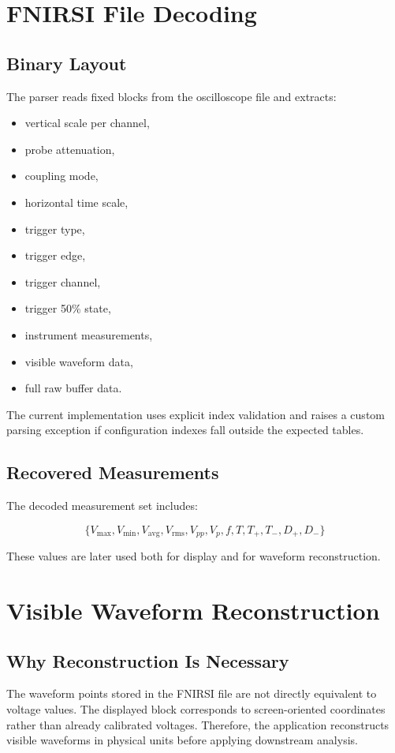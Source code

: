 \documentclass[conference]{IEEEtran}
\begin{document}
\section{FNIRSI File Decoding}
\subsection{Binary Layout}
The parser reads fixed blocks from the oscilloscope file and extracts:

\begin{itemize}
    \item vertical scale per channel,
    \item probe attenuation,
    \item coupling mode,
    \item horizontal time scale,
    \item trigger type,
    \item trigger edge,
    \item trigger channel,
    \item trigger 50\% state,
    \item instrument measurements,
    \item visible waveform data,
    \item full raw buffer data.
\end{itemize}

The current implementation uses explicit index validation and raises a custom parsing exception if configuration indexes fall outside the expected tables.

\subsection{Recovered Measurements}
The decoded measurement set includes:

\begin{equation}
\{V_{\max}, V_{\min}, V_{\mathrm{avg}}, V_{\mathrm{rms}}, V_{pp}, V_p, f, T, T_+, T_-, D_+, D_-\}
\end{equation}

These values are later used both for display and for waveform reconstruction.

\section{Visible Waveform Reconstruction}
\subsection{Why Reconstruction Is Necessary}
The waveform points stored in the FNIRSI file are not directly equivalent to voltage values. The displayed block corresponds to screen-oriented coordinates rather than already calibrated voltages. Therefore, the application reconstructs visible waveforms in physical units before applying downstream analysis.
\end{document}
